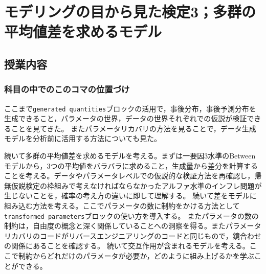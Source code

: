 \section{モデリングの目から見た検定3；多群の平均値差を求めるモデル}
\subsection{授業内容}
\subsubsection{科目の中でのこのコマの位置づけ}
ここまで\verb|generated quantities|ブロックの活用で，事後分布，事後予測分布を生成できること，パラメータの世界，データの世界それぞれでの仮説が検証できることを見てきた。
またパラメータリカバリの方法を見ることで，データ生成モデルを分析前に活用する方法についても見た。

続いて多群の平均値差を求めるモデルを考える。まずは一要因3水準のBetweenモデルから，3つの平均値をバラバラに求めること，生成量から差分を計算することを考える。データやパラメータレベルでの仮説的な検証方法を再確認し，帰無仮説検定の枠組みで考えなければならなかったアルファ水準のインフレ問題が生じないことを，確率の考え方の違いに即して理解する。
続いて差をモデルに組み込む方法を考える。ここでパラメータの数に制約をかける方法として\verb|transformed parameters|ブロックの使い方を導入する。
またパラメータの数の制約は，自由度の概念と深く関係していることへの洞察を得る。またパラメータリカバリのコードがリバースエンジニアリングのコードと同じもので，鏡合わせの関係にあることを確認する。
続いて交互作用が含まれるモデルを考える。ここで制約からどれだけのパラメータが必要か，どのように組み上げるかを学ぶことができる。


